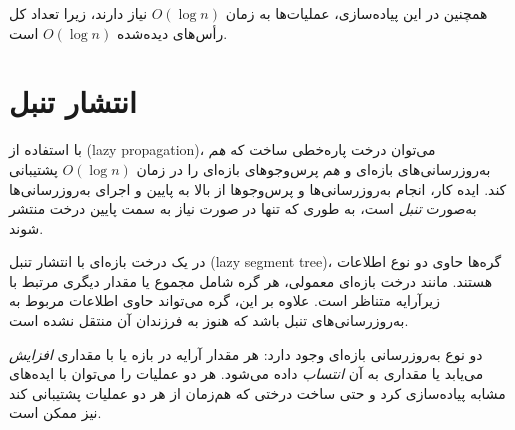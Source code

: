 \begin{center}
\end{center}

همچنین در این پیاده‌سازی،
عملیات‌ها به زمان $O(\log n)$ نیاز دارند،
زیرا تعداد کل رأس‌های دیده‌شده $O(\log n)$ است.

\section{انتشار تنبل}


با استفاده از  (lazy propagation)، می‌توان
درخت پاره‌خطی ساخت که \emph{هم} به‌روزرسانی‌های بازه‌ای
و \emph{هم} پرس‌وجوهای بازه‌ای را در زمان $O(\log n)$ پشتیبانی کند.
ایده کار، انجام به‌روزرسانی‌ها و پرس‌وجوها
از بالا به پایین و اجرای به‌روزرسانی‌ها به‌صورت
\emph{تنبل} است، به طوری که تنها در صورت نیاز
به سمت پایین درخت منتشر شوند.

در یک درخت بازه‌ای با انتشار تنبل (lazy segment tree)، گره‌ها حاوی دو نوع اطلاعات هستند.
مانند درخت بازه‌ای معمولی، هر گره شامل مجموع یا مقدار دیگری مرتبط با زیرآرایه متناظر است.
علاوه بر این، گره می‌تواند حاوی اطلاعات مربوط به به‌روزرسانی‌های تنبل باشد که هنوز به فرزندان آن منتقل نشده است.

دو نوع به‌روزرسانی بازه‌ای وجود دارد:
هر مقدار آرایه در بازه یا با مقداری \emph{افزایش} می‌یابد
یا مقداری به آن \emph{انتساب} داده می‌شود.
هر دو عملیات را می‌توان با ایده‌های مشابه پیاده‌سازی کرد و حتی ساخت درختی که هم‌زمان از هر دو عملیات پشتیبانی کند نیز ممکن است.

